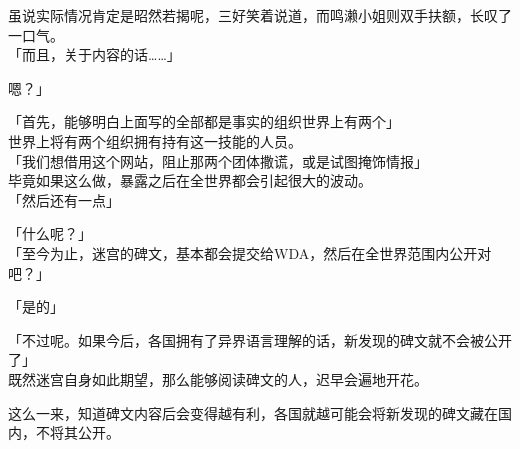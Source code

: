 虽说实际情况肯定是昭然若揭呢，三好笑着说道，而鸣濑小姐则双手扶额，长叹了一口气。\\

「而且，关于内容的话……」

嗯？」

「首先，能够明白上面写的全部都是事实的组织世界上有两个」\\

世界上将有两个组织拥有持有这一技能的人员。\\

「我们想借用这个网站，阻止那两个团体撒谎，或是试图掩饰情报」\\

毕竟如果这么做，暴露之后在全世界都会引起很大的波动。\\

「然后还有一点」

「什么呢？」\\

「至今为止，迷宫的碑文，基本都会提交给WDA，然后在全世界范围内公开对吧？」

「是的」

「不过呢。如果今后，各国拥有了异界语言理解的话，新发现的碑文就不会被公开了」\\

既然迷宫自身如此期望，那么能够阅读碑文的人，迟早会遍地开花。

这么一来，知道碑文内容后会变得越有利，各国就越可能会将新发现的碑文藏在国内，不将其公开。\\

